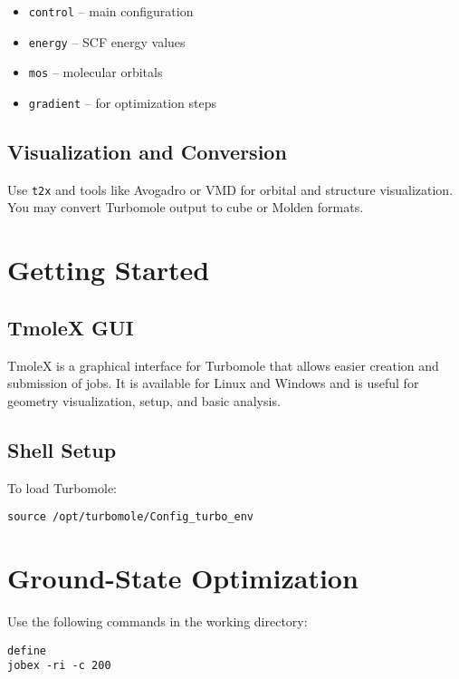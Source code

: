 \begin{itemize}
  \item \texttt{control} – main configuration
  \item \texttt{energy} – SCF energy values
  \item \texttt{mos} – molecular orbitals
  \item \texttt{gradient} – for optimization steps
\end{itemize}

\subsection*{Visualization and Conversion}

Use \texttt{t2x} and tools like Avogadro or VMD for orbital and structure visualization. You may convert Turbomole output to cube or Molden formats.


\section{Getting Started}

\subsection*{TmoleX GUI}

TmoleX is a graphical interface for Turbomole that allows easier creation and submission of jobs. It is available for Linux and Windows and is useful for geometry visualization, setup, and basic analysis.

\subsection*{Shell Setup}

To load Turbomole:

\begin{verbatim}
source /opt/turbomole/Config_turbo_env
\end{verbatim}

\section{Ground-State Optimization}

Use the following commands in the working directory:

\begin{verbatim}
define
jobex -ri -c 200
\end{verbatim}


